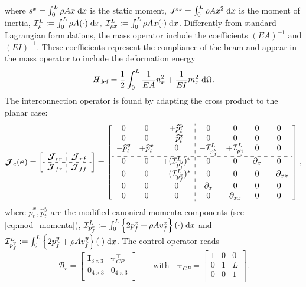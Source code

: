 \documentclass{svjour3}                     %
\newcommand{\firstRev}[1]{\textcolor{red!80!black}{#1}}
\begin{document}
where  $s^x = \int_{0}^{L} \rho A x \d{x}$ is the static moment, $J^{zz} = \int_{0}^{L} \rho A x^2 \d{x}$ is the moment of inertia, $\mathcal{I}_\rho^L := \int_{0}^L \rho A (\cdot) \d{x}, \; \mathcal{I}_{\rho x}^L := \int_{0}^L \rho A x (\cdot) \d{x}$. \firstRev{Differently from standard Lagrangian formulations, the mass operator include the coefficients $(EA)^{-1}$ and $(EI)^{-1}$. These coefficients represent the compliance of the beam and appear in the mass operator to include the deformation energy
\begin{equation*}
H_{\text{def}} = \frac{1}{2}\int_{0}^L \frac{1}{EA} n_x^2 + \frac{1}{EI} m_x^2  \d\Omega.
\end{equation*}
} The interconnection operator is found by adapting the cross product to the planar case:
\begin{equation}
\label{eq:EB_J}
\bm{\mathcal{J}}_{e}(\bm{e}) = 
\left[ \begin{array}{c:c}
\bm{\mathcal{J}}_{rr} & \bm{\mathcal{J}}_{rf} \\
\hdashline
\bm{\mathcal{J}}_{fr} & \bm{\mathcal{J}}_{ff} \\
\end{array} \right] = 
\left[ \begin{array}{ccc:cccc}
0 & 0 & +\widehat{p}_t^y      & 0 & 0 & 0 & 0 \\
0 & 0 & -\widehat{p}_t^x     & 0 & 0 & 0 & 0 \\
-\widehat{p}_t^y & +\widehat{p}_t^x & 0 & -\mathcal{I}_{p_f^y}^{L} & +\mathcal{I}_{p_f^x}^{L} & 0 & 0 \\
\hdashline 
0 & 0 & +(\mathcal{I}_{p_f^y}^{L})^* & 0 & 0 & \partial_x & 0  \\
0 & 0 & -(\mathcal{I}_{p_f^x}^{L})^* & 0 & 0 & 0 & -\partial_{xx} \\
0 & 0 & 0 & \partial_{x} & 0 & 0 & 0 \\
0 & 0 & 0 & 0 & \partial_{xx} & 0 & 0 \\
\end{array} \right],
\end{equation}
where $\widehat{p}_t^x, \widehat{p}_t^y$ are the modified canonical momenta components (see \eqref{eq:mod_momenta}), $\mathcal{I}_{p_f^x}^{L} := \int_{0}^{L} \left\{2 p_f^x + \rho A v_f^x \right\} (\cdot) \d{x}$ and $\mathcal{I}_{p_f^y}^{L} := \int_{0}^{L} \left\{2 p_f^y + \rho A v_f^y \right\} (\cdot) \d{x}$. The control operator reads
\begin{equation}
\bm{\mathcal{B}}_r = \begin{bmatrix}
\bm{I}_{3\times 3} & \bm\tau_{CP}^\top \\
0_{4\times 3} & 0_{4\times 3} \\
\end{bmatrix} \qquad \text{with} \quad
\bm\tau_{CP} = \begin{bmatrix}
1 & 0 & 0 \\
0 & 1 & L \\
0 & 0 & 1 \\
\end{bmatrix}.
\end{equation}
\end{document}
